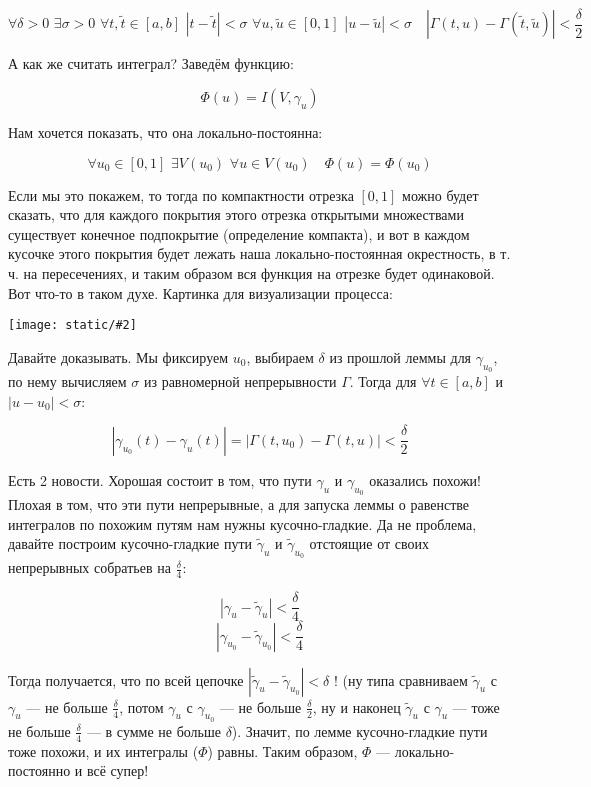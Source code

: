 \documentclass{article}
\def\dbl{\,\,}
\def\images#1#2{\begin{center}\texttt{[image: static/\#2]}\end{center}}
\begin{document}
\[\forall \delta > 0 \dbl \exists \sigma > 0 \dbl \forall t, \tilde{t} \in [a, b] \dbl |t - \tilde{t}| < \sigma \dbl \forall u, \tilde{u} \in [0, 1] \dbl |u - \tilde{u}| < \sigma \quad |\Gamma(t, u) - \Gamma(\tilde{t}, \tilde{u})| < \frac{\delta}{2}\]

А как же считать интеграл? Заведём функцию:

\[\Phi(u) = I(V, \gamma_u)\]

Нам хочется показать, что она локально-постоянна:

\[\forall u_0 \in [0, 1] \dbl \exists V(u_0) \dbl \forall u \in V(u_0) \quad \Phi(u) = \Phi(u_0)\]

Если мы это покажем, то тогда по компактности отрезка $[0, 1]$ можно будет сказать, что для каждого покрытия этого отрезка открытыми множествами существует конечное подпокрытие (определение компакта), и вот в каждом кусочке этого покрытия будет лежать наша локально-постоянная окрестность, в т. ч. на пересечениях, и таким образом вся функция на отрезке будет одинаковой. Вот что-то в таком духе. Картинка для визуализации процесса:

\images{0.3}{rav_gomotop_put.jpg}

Давайте доказывать. Мы фиксируем $u_0$, выбираем $\delta$ из прошлой леммы для $\gamma_{u_0}$, по нему вычисляем $\sigma$ из равномерной непрерывности $\Gamma$. Тогда для $\forall t \in [a, b]$ и $|u - u_0| < \sigma$:

\[|\gamma_{u_0}(t) - \gamma_{u}(t)| = |\Gamma(t, u_0) - \Gamma(t, u)| < \frac{\delta}{2}\]

Есть 2 новости. Хорошая состоит в том, что пути $\gamma_{u}$ и $\gamma_{u_0}$ оказались похожи! Плохая в том, что эти пути непрерывные, а для запуска леммы о равенстве интегралов по похожим путям нам нужны кусочно-гладкие. Да не проблема, давайте построим кусочно-гладкие пути $\tilde{\gamma}_{u}$ и $\tilde{\gamma}_{u_0}$ отстоящие от своих непрерывных собратьев на $\frac{\delta}{4}$:

\[|\gamma_{u} - \tilde{\gamma}_{u}| < \frac{\delta}{4}\]
\[|\gamma_{u_0} - \tilde{\gamma}_{u_0}| < \frac{\delta}{4}\]

Тогда получается, что по всей цепочке $|\tilde{\gamma}_{u} - \tilde{\gamma}_{u_0}| < \delta$ ! (ну типа сравниваем $\tilde{\gamma}_{u}$ с $\gamma_{u}$ --- не больше $\frac{\delta}{4}$, потом $\gamma_{u}$ с $\gamma_{u_{0}}$ --- не больше $\frac{\delta}{2}$, ну и наконец $\tilde{\gamma}_{u}$ с $\gamma_{u}$ --- тоже не больше $\frac{\delta}{4}$ --- в сумме не больше $\delta$). Значит, по лемме кусочно-гладкие пути тоже похожи, и их интегралы ($\Phi$) равны. Таким образом, $\Phi$ --- локально-постоянно и всё супер!
\end{document}
